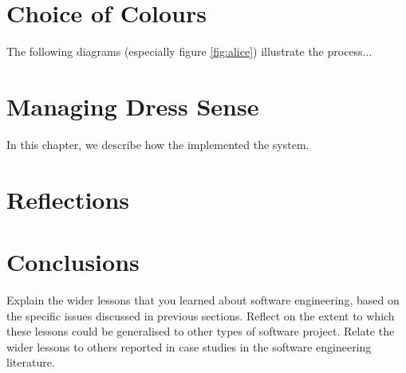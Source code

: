 \documentclass{l3proj}
\begin{document}

\section{Choice of Colours}
\label{design}

The following diagrams (especially figure \ref{fig:alice}) illustrate the
process...

\section{Managing Dress Sense}
\label{managing}

In this chapter, we describe how the implemented the system.

\section{Reflections}
\label{sec:reflections}

\section{Conclusions}
\label{sec:conclusions}

Explain the wider lessons that you learned about software engineering,
based on the specific issues discussed in previous sections.  Reflect
on the extent to which these lessons could be generalised to other
types of software project.  Relate the wider lessons to others
reported in case studies in the software engineering literature.



\end{document}
